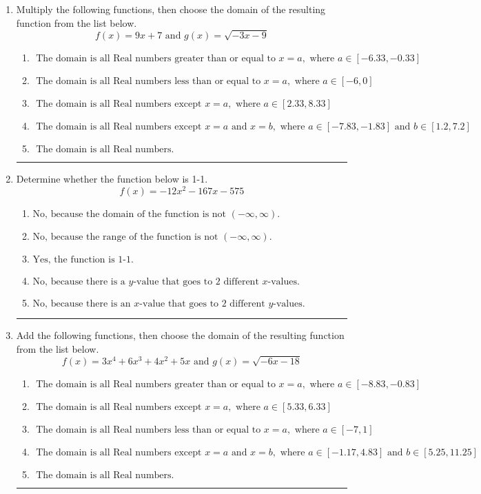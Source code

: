 \documentclass[14pt]{extbook}
\newcommand{\litem}[1]{\item#1\hspace*{-1cm}\rule{\textwidth}{0.4pt}}
\begin{document}
\begin{enumerate}
{\begin{enumerate}[label=\Alph*.]
\end{enumerate} }
\litem{
Multiply the following functions, then choose the domain of the resulting function from the list below.\[ f(x) = 9x + 7 \text{ and } g(x) = \sqrt{-3x-9}  \]\begin{enumerate}[label=\Alph*.]
\item \( \text{ The domain is all Real numbers greater than or equal to } x = a, \text{ where } a \in [-6.33, -0.33] \)
\item \( \text{ The domain is all Real numbers less than or equal to } x = a, \text{ where } a \in [-6, 0] \)
\item \( \text{ The domain is all Real numbers except } x = a, \text{ where } a \in [2.33, 8.33] \)
\item \( \text{ The domain is all Real numbers except } x = a \text{ and } x = b, \text{ where } a \in [-7.83, -1.83] \text{ and } b \in [1.2, 7.2] \)
\item \( \text{ The domain is all Real numbers. } \)

\end{enumerate} }
\litem{
Determine whether the function below is 1-1.\[ f(x) = -12 x^2 - 167 x - 575 \]\begin{enumerate}[label=\Alph*.]
\item \( \text{No, because the domain of the function is not $(-\infty, \infty)$.} \)
\item \( \text{No, because the range of the function is not $(-\infty, \infty)$.} \)
\item \( \text{Yes, the function is 1-1.} \)
\item \( \text{No, because there is a $y$-value that goes to 2 different $x$-values.} \)
\item \( \text{No, because there is an $x$-value that goes to 2 different $y$-values.} \)

\end{enumerate} }
\litem{
Add the following functions, then choose the domain of the resulting function from the list below.\[ f(x) = 3x^{4} +6 x^{3} +4 x^{2} +5 x \text{ and } g(x) = \sqrt{-6x-18}  \]\begin{enumerate}[label=\Alph*.]
\item \( \text{ The domain is all Real numbers greater than or equal to } x = a, \text{ where } a \in [-8.83, -0.83] \)
\item \( \text{ The domain is all Real numbers except } x = a, \text{ where } a \in [5.33, 6.33] \)
\item \( \text{ The domain is all Real numbers less than or equal to } x = a, \text{ where } a \in [-7, 1] \)
\item \( \text{ The domain is all Real numbers except } x = a \text{ and } x = b, \text{ where } a \in [-1.17, 4.83] \text{ and } b \in [5.25, 11.25] \)
\item \( \text{ The domain is all Real numbers. } \)

\end{enumerate} }
\end{enumerate}
\end{document}
